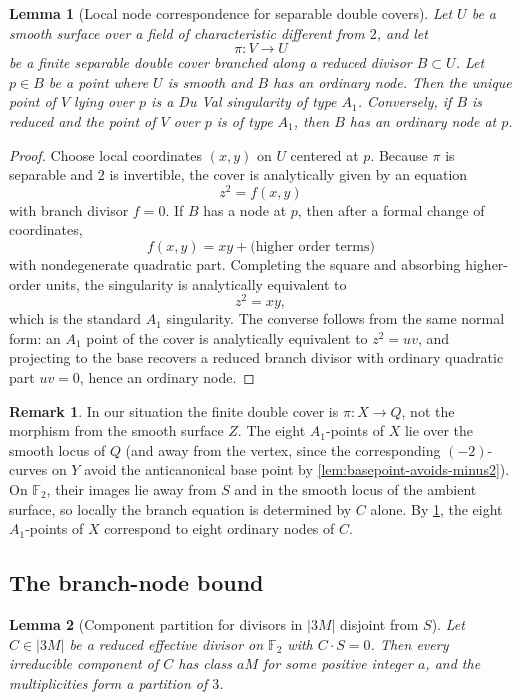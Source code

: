 \documentclass[11pt]{article}
\newtheorem{lemma}[lemma]{Lemma}
\theoremstyle{definition}
\newtheorem{remark}[remark]{Remark}
\begin{document}
\begin{lemma}[Local node correspondence for separable double covers]\label{lem:node-correspondence}
Let $U$ be a smooth surface over a field of characteristic different from $2$, and let
\[
\pi\colon V\to U
\]
be a finite separable double cover branched along a reduced divisor $B\subset U$. Let $p\in B$ be a point where $U$ is smooth and $B$ has an ordinary node. Then the unique point of $V$ lying over $p$ is a Du Val singularity of type $A_1$. Conversely, if $B$ is reduced and the point of $V$ over $p$ is of type $A_1$, then $B$ has an ordinary node at $p$.
\end{lemma}

\begin{proof}
Choose local coordinates $(x,y)$ on $U$ centered at $p$. Because $\pi$ is separable and $2$ is invertible, the cover is analytically given by an equation
\[
z^2=f(x,y)
\]
with branch divisor $f=0$. If $B$ has a node at $p$, then after a formal change of coordinates,
\[
f(x,y)=xy+\text{(higher order terms)}
\]
with nondegenerate quadratic part. Completing the square and absorbing higher-order units, the singularity is analytically equivalent to
\[
z^2=xy,
\]
which is the standard $A_1$ singularity. The converse follows from the same normal form: an $A_1$ point of the cover is analytically equivalent to $z^2=uv$, and projecting to the base recovers a reduced branch divisor with ordinary quadratic part $uv=0$, hence an ordinary node.
\end{proof}

\begin{remark}\label{rem:node-on-X}
In our situation the finite double cover is $\pi\colon X\to Q$, not the morphism from the smooth surface $Z$. The eight $A_1$-points of $X$ lie over the smooth locus of $Q$ (and away from the vertex, since the corresponding $(-2)$-curves on $Y$ avoid the anticanonical base point by \cref{lem:basepoint-avoids-minus2}). On $\mathbb F_2$, their images lie away from $S$ and in the smooth locus of the ambient surface, so locally the branch equation is determined by $C$ alone. By \cref{lem:node-correspondence}, the eight $A_1$-points of $X$ correspond to eight ordinary nodes of $C$.
\end{remark}

\subsection{The branch-node bound}

\begin{lemma}[Component partition for divisors in $|3M|$ disjoint from $S$]\label{lem:component-partition}
Let $C\in |3M|$ be a reduced effective divisor on $\mathbb F_2$ with $C\cdot S=0$. Then every irreducible component of $C$ has class $aM$ for some positive integer $a$, and the multiplicities form a partition of $3$.
\end{lemma}
\end{document}
